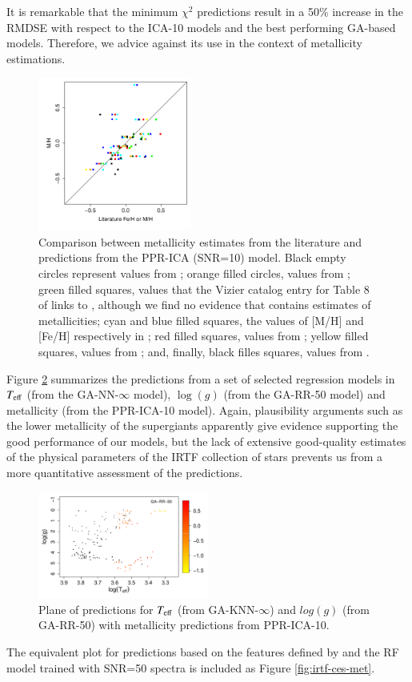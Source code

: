 It is remarkable that the minimum $\chi^2$ predictions result in a
50\% increase in the RMDSE with respect to the ICA-10 models and the
best performing GA-based models. Therefore, we advice against its use
in the context of metallicity estimations. 

 \begin{figure}
 \centering
 \includegraphics[width=0.45\textwidth]{figs/irtf-figs/M-ICA10.pdf}

\caption{Comparison
  between metallicity estimates from the literature and predictions
  from the PPR-ICA (SNR=10) model.  Black empty circles represent
  values from \cite{cesetti} ; orange filled circles, values
  from \cite{NevesIII}; green filled squares, values that the Vizier
  catalog entry for Table 8 of \cite{NevesIII} links to \cite{Jao},
  although we find no evidence that \cite{Jao} contains estimates of
  metallicities; cyan and blue filled squares, the values of [M/H] and
  [Fe/H] respectively in \cite{RA2012}; red filled squares, values
  from \cite{Mann2015}; yellow filled squares, values
  from \cite{Newton2014}; and, finally, black filles squares, values
  from \cite{Gaidos2015}.}

\label{MIRTF_ICA_10}
\end {figure}

Figure \ref{fig:irtf-teff-logg-met} summarizes the predictions from a
set of selected regression models in $T_{\rm eff}$ (from the
GA-NN-$\infty$ model), $\log(g)$ (from the GA-RR-50 model) and
metallicity (from the PPR-ICA-10 model). Again, plausibility arguments
such as the lower metallicity of the supergiants apparently give
evidence supporting the good performance of our models, but the lack
of extensive good-quality estimates of the physical parameters of the
IRTF collection of stars prevents us from a more quantitative
assessment of the predictions.

 \begin{figure}
 \centering
 \includegraphics[width=0.5\textwidth]{figs/ordieres-fig8.pdf}
\caption{Plane of predictions for $T_{\rm eff}$ (from GA-KNN-$\infty$)
and $log(g)$ (from GA-RR-50) with metallicity predictions from
PPR-ICA-10.}
\label{fig:irtf-teff-logg-met}
\end {figure}

The equivalent plot for predictions based on the features defined
by \cite{cesetti} and the RF model trained with SNR=50 spectra is
included as Figure \ref{fig:irtf-ces-met}.


